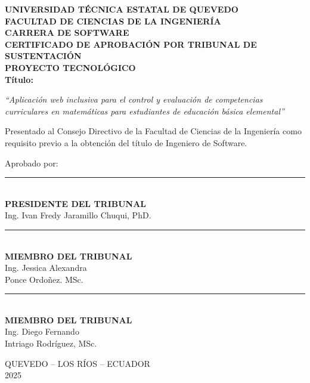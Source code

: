 \begin{center}
    \vspace*{0.3cm}
    {\bfseries UNIVERSIDAD TÉCNICA ESTATAL DE QUEVEDO}\\[0.3cm]
    {\bfseries FACULTAD DE CIENCIAS DE LA INGENIERÍA}\\[0.3cm]
    {\bfseries CARRERA DE SOFTWARE}\\[1cm]

    {\bfseries CERTIFICADO DE APROBACIÓN POR TRIBUNAL DE SUSTENTACIÓN}\\[0.5cm]
    {\bfseries PROYECTO TECNOLÓGICO}\\[0.8cm]

    \textbf{Título:}\\[0.3cm]
    \begin{minipage}{0.85\textwidth}
        \centering
        \itshape
        ``Aplicación web inclusiva para el control y evaluación de competencias curriculares en matemáticas para estudiantes de educación básica elemental''
    \end{minipage}
\end{center}

\vspace{0.6cm}
\justifying
Presentado al Consejo Directivo de la Facultad de Ciencias de la Ingeniería como requisito previo a la obtención del título de Ingeniero de Software.

\vspace{0.4cm}
Aprobado por:

\vspace{1.5cm}
\begin{center}
    \rule{8cm}{0.4pt}\\[0.2cm]
    \textbf{PRESIDENTE DEL TRIBUNAL}\\
    Ing. Ivan Fredy Jaramillo Chuqui, PhD.
\end{center}

\vspace{1.2cm}
\begin{center}
    \begin{minipage}{0.45\textwidth}
        \centering
        \rule{6cm}{0.4pt}\\[0.2cm]
        \textbf{MIEMBRO DEL TRIBUNAL}\\
        Ing. Jessica Alexandra\\
        Ponce Ordoñez. MSc.
    \end{minipage}
    \hfill
    \begin{minipage}{0.45\textwidth}
        \centering
        \rule{6cm}{0.4pt}\\[0.2cm]
        \textbf{MIEMBRO DEL TRIBUNAL}\\
        Ing. Diego Fernando\\
        Intriago Rodríguez, MSc.
    \end{minipage}
\end{center}

\vspace{1.5cm}
\begin{center}
    QUEVEDO -- LOS RÍOS -- ECUADOR\\[0.3cm]
    2025
\end{center}

\newpage
